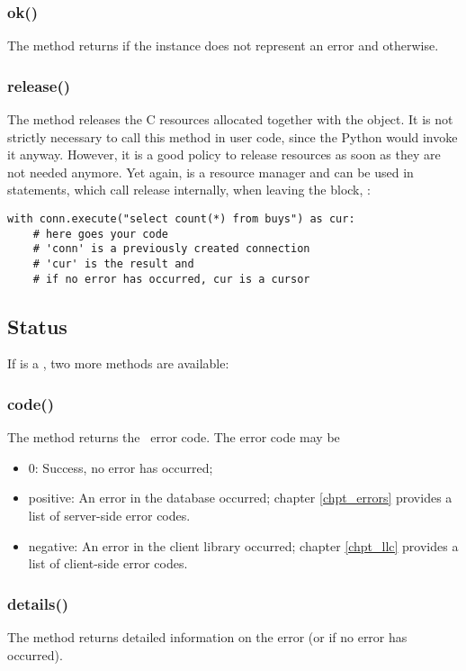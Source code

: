 \subsubsection{ok()}
The method returns 
if the instance does not represent
an error and  otherwise.

\subsubsection{release()}
The method releases the C resources
allocated together with the  object.
It is not strictly necessary to call
this method in user code, since the
Python  would invoke it anyway.
However, it is a good policy
to release resources as soon as
they are not needed anymore.
Yet again,  is a resource manager
and can be used in  statements,
which call release internally, when leaving
the block, \eg:

\begin{python}
\begin{lstlisting}
with conn.execute("select count(*) from buys") as cur:
    # here goes your code
    # 'conn' is a previously created connection
    # 'cur' is the result and
    # if no error has occurred, cur is a cursor
\end{lstlisting}
\end{python}

\subsection{Status}
If  is a ,
two more methods are available:

\subsubsection{code()}
The method returns the \nowdb\ error code.
The error code may be
\begin{itemize}
\item 0: Success, no error has occurred;
\item positive:
An error in the database occurred;
chapter \ref{chpt_errors} provides a list
of server-side error codes.
\item negative:
An error in the client library occurred;
chapter \ref{chpt_llc} provides a list
of client-side error codes.
\end{itemize}

\subsubsection{details()}
The method returns
detailed information on the error
(or  if no error has occurred).

